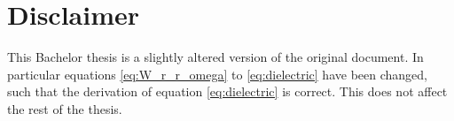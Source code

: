 \chapter*{Disclaimer}

This Bachelor thesis is a slightly altered version of the original document. In particular equations \ref{eq:W_r_r_omega} to \ref{eq:dielectric} have been changed, such that the derivation of equation \ref{eq:dielectric} is correct. This does not affect the rest of the thesis.